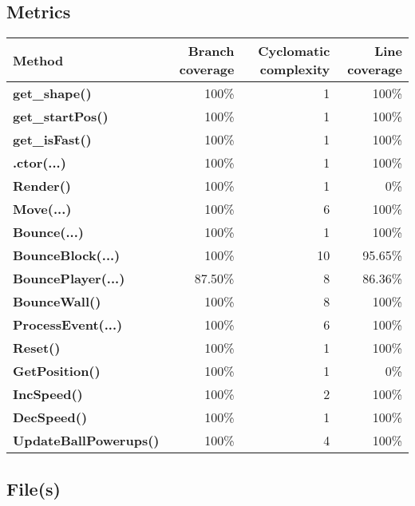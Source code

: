 \documentclass[a4paper,landscape,10pt]{article}
\begin{document}
\subsection{Metrics}
\begin{longtable}[l]{|l|r|r|r|}
\hline
\textbf{Method} & \textbf{Branch coverage} & \textbf{Cyclomatic complexity} & \textbf{Line coverage}\\
\hline
\textbf{get\_shape()} & 100\% & 1 & 100\%\\
\hline
\textbf{get\_startPos()} & 100\% & 1 & 100\%\\
\hline
\textbf{get\_isFast()} & 100\% & 1 & 100\%\\
\hline
\textbf{.ctor(...)} & 100\% & 1 & 100\%\\
\hline
\textbf{Render()} & 100\% & 1 & 0\%\\
\hline
\textbf{Move(...)} & 100\% & 6 & 100\%\\
\hline
\textbf{Bounce(...)} & 100\% & 1 & 100\%\\
\hline
\textbf{BounceBlock(...)} & 100\% & 10 & 95.65\%\\
\hline
\textbf{BouncePlayer(...)} & 87.50\% & 8 & 86.36\%\\
\hline
\textbf{BounceWall()} & 100\% & 8 & 100\%\\
\hline
\textbf{ProcessEvent(...)} & 100\% & 6 & 100\%\\
\hline
\textbf{Reset()} & 100\% & 1 & 100\%\\
\hline
\textbf{GetPosition()} & 100\% & 1 & 0\%\\
\hline
\textbf{IncSpeed()} & 100\% & 2 & 100\%\\
\hline
\textbf{DecSpeed()} & 100\% & 1 & 100\%\\
\hline
\textbf{UpdateBallPowerups()} & 100\% & 4 & 100\%\\
\hline
\end{longtable}
\subsection{File(s)}
\end{document}

